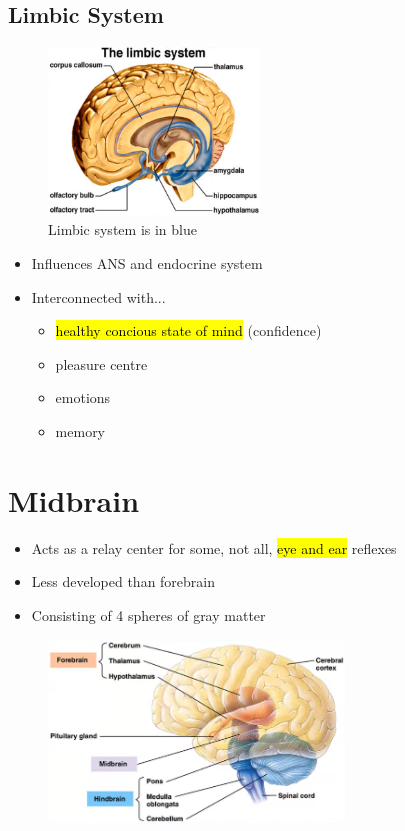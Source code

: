 \documentclass[a4paper,12pt]{article}
\begin{document}
\subsection{Limbic System}
\begin{figure}[H]
    \centering
    \includegraphics[width=0.50\textwidth]{limbic}
    \caption{Limbic system is in blue}
\end{figure}
\begin{itemize}
    \item{Influences ANS and endocrine system}
    \item{
            Interconnected with...
            \begin{itemize}
                \item{\hl{healthy concious state of mind} (confidence)}
                \item{pleasure centre}
                \item{emotions}
                \item{memory}
            \end{itemize}
        }
\end{itemize}

\section{Midbrain}
\begin{itemize}
    \item{Acts as a relay center for some, not all, \hl{eye and ear} reflexes}
    \item{Less developed than forebrain}
    \item{Consisting of 4 spheres of gray matter}
\end{itemize}

\begin{figure}[H]
    \centering
    \includegraphics[width=0.7\textwidth]{brains}
\end{figure}
\end{document}
